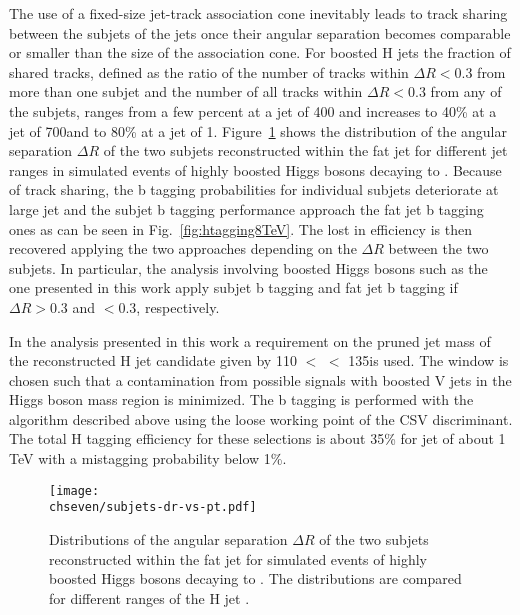 The use of a fixed-size jet-track association cone inevitably leads to track sharing between the subjets of the jets once their angular separation becomes comparable
or smaller than the size of the association cone. 
For boosted H jets the fraction of shared tracks, defined as the ratio of the number of tracks within $\Delta R < 0.3$
from more than one subjet and the number of all tracks within $\Delta R < 0.3$ from any of the subjets,
ranges from a few percent at a jet \pt of 400\GeV
and increases to 40\% at a jet \pt of 700\GeV and to 80\% at a jet \pt of 1\TeV.
Figure~\ref{fig:subjetdR} shows the distribution of the angular separation $\Delta R$ of the two subjets reconstructed within the fat jet for different jet \pt ranges 
in simulated events of highly boosted Higgs bosons decaying to \bbbar.
Because of track sharing, the b tagging probabilities for individual subjets deteriorate at large jet \pt and the subjet b tagging performance approach the
fat jet b tagging ones as can be seen in Fig.~\ref{fig:htagging8TeV}.
The lost in efficiency is then recovered applying the two approaches depending on the $\Delta R$ between the two subjets.
In particular, the analysis involving boosted Higgs bosons such as the one presented in this work
apply subjet b tagging and fat jet b tagging if $\Delta R > 0.3$ and $< 0.3$, respectively. 

In the \lnuHjet analysis presented in this work a requirement on the pruned jet mass of the reconstructed H jet candidate given by 110 $<$ \mJ $<$ 135\GeV is used. The \mJ window is chosen such that a contamination from possible signals with boosted V jets in the Higgs boson mass region is minimized. The b tagging is performed with the algorithm described above using the loose working point of the CSV discriminant. The total H tagging efficiency for these selections is about 35\% for jet \pt of about 1 TeV with a mistagging probability below 1\%.

\begin{figure}[!htb]
 \begin{center}
  \texttt{[image: \\chseven/subjets-dr-vs-pt.pdf]}
 \end{center}
 \caption{\small Distributions of the angular separation $\Delta R$ of the two subjets reconstructed within the fat jet for simulated events of highly boosted Higgs bosons decaying to \bbbar. The distributions are compared for different ranges of the H jet \pt.}
 \label{fig:subjetdR}
\end{figure}

